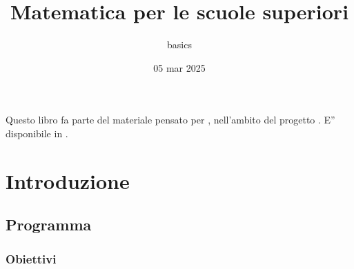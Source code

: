 \documentclass[letterpaper,10pt,italian]{jupyterBook}
\title{Matematica per le scuole superiori}
\date{05 mar 2025}
\author{basics}
\begin{document}
\pagestyle{empty}
\sphinxmaketitle
\pagestyle{plain}
\sphinxtableofcontents
\pagestyle{normal}
\label{\detokenize{intro::doc}}


\sphinxAtStartPar
Questo libro fa parte del materiale pensato per , nell’ambito del progetto . E” disponibile in .



\sphinxAtStartPar
{\hyperref[\detokenize{ch/program:math-hs-intro-how-to}]{}}

\sphinxstepscope


\part{Introduzione}

\sphinxstepscope


\chapter{Programma}
\label{\detokenize{ch/program:programma}}\label{\detokenize{ch/program::doc}}

\section{Obiettivi}
\label{\detokenize{ch/program:obiettivi}}
\end{document}

